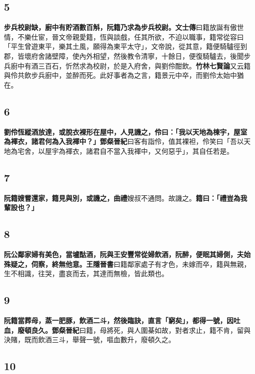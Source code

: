 \subsection*{5}

\textbf{步兵校尉缺，廚中有貯酒數百斛，阮籍乃求為步兵校尉。}{\footnotesize \textbf{文士傳}曰籍放誕有傲世情，不樂仕宦，晉文帝親愛籍，恆與談戲，任其所欲，不迫以職事，籍常從容曰「平生曾遊東平，樂其土風，願得為東平太守」，文帝說，從其意，籍便騎驢徑到郡，皆壞府舍諸壁障，使內外相望，然後教令清寧，十餘日，便復騎驢去，後聞步兵廚中有酒三百石，忻然求為校尉，於是入府舍，與劉伶酣飲。\textbf{竹林七賢論}又云籍與伶共飲步兵廚中，並醉而死。此好事者為之言，籍景元中卒，而劉伶太始中猶在。}

\subsection*{6}

\textbf{劉伶恆縱酒放達，或脫衣裸形在屋中，人見譏之，伶曰：「我以天地為棟宇，屋室為褌衣，諸君何為入我褌中？」}{\footnotesize \textbf{鄧粲晉紀}曰客有詣伶，值其裸袒，伶笑曰「吾以天地為宅舍，以屋宇為褌衣，諸君自不當入我褌中，又何惡乎」，其自任若是。}

\subsection*{7}

\textbf{阮籍嫂嘗還家，籍見與別，或譏之，}{\footnotesize \textbf{曲禮}嫂叔不通問。故譏之。}\textbf{籍曰：「禮豈為我輩設也？」}

\subsection*{8}

\textbf{阮公鄰家婦有美色，當壚酤酒，阮與王安豐常從婦飲酒，阮醉，便眠其婦側，夫始殊疑之，伺察，終無他意。}{\footnotesize \textbf{王隱晉書}曰籍鄰家處子有才色，未嫁而卒，籍與無親，生不相識，往哭，盡哀而去，其達而無檢，皆此類也。}

\subsection*{9}

\textbf{阮籍當葬母，蒸一肥豚，飲酒二斗，然後臨訣，直言「窮矣」，都得一號，因吐血，廢頓良久。}{\footnotesize \textbf{鄧粲晉紀}曰籍，母將死，與人圍棊如故，對者求止，籍不肯，留與決賭，既而飲酒三斗，舉聲一號，嘔血數升，廢頓久之。}

\subsection*{10}

